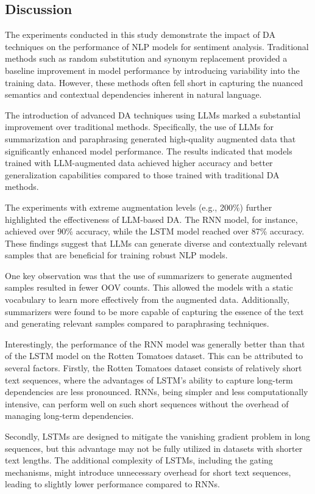 \documentclass[10pt]{extarticle}
\begin{document}
\subsection{Discussion}

The experiments conducted in this study demonstrate the impact of DA techniques
on the performance of NLP models for sentiment analysis. Traditional methods
such as random substitution and synonym replacement provided a baseline
improvement in model performance by introducing variability into the training
data. However, these methods often fell short in capturing the nuanced
semantics and contextual dependencies inherent in natural language.

The introduction of advanced DA techniques using LLMs marked a substantial
improvement over traditional methods. Specifically, the use of LLMs for
summarization and paraphrasing generated high-quality augmented data that
significantly enhanced model performance. The results indicated that models
trained with LLM-augmented data achieved higher accuracy and better
generalization capabilities compared to those trained with traditional DA
methods.

The experiments with extreme augmentation levels (e.g., 200\%) further
highlighted the effectiveness of LLM-based DA. The RNN model, for instance,
achieved over 90\% accuracy, while the LSTM model reached over 87\% accuracy.
These findings suggest that LLMs can generate diverse and contextually relevant
samples that are beneficial for training robust NLP models.

One key observation was that the use of summarizers to generate augmented
samples resulted in fewer OOV counts. This allowed the models with a static
vocabulary to learn more effectively from the augmented data. Additionally,
summarizers were found to be more capable of capturing the essence of the text
and generating relevant samples compared to paraphrasing techniques.

Interestingly, the performance of the RNN model was generally better than that
of the LSTM model on the Rotten Tomatoes dataset. This can be attributed to
several factors. Firstly, the Rotten Tomatoes dataset consists of relatively
short text sequences, where the advantages of LSTM's ability to capture
long-term dependencies are less pronounced. RNNs, being simpler and less
computationally intensive, can perform well on such short sequences without the
overhead of managing long-term dependencies.

Secondly, LSTMs are designed to mitigate the vanishing gradient problem in long
sequences, but this advantage may not be fully utilized in datasets with
shorter text lengths. The additional complexity of LSTMs, including the gating
mechanisms, might introduce unnecessary overhead for short text sequences,
leading to slightly lower performance compared to RNNs.
\end{document}
